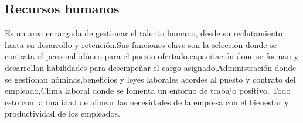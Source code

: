 
\subsection{Recursos humanos}
Es un area encargada de gestionar el talento humano, desde su reclutamiento hasta su desarrollo y retención.Sus funciones clave son la selección donde se contrata el personal idóneo para el puesto ofertado,capacitación done se forman y desarrollan habilidades para desempeñar el cargo asignado,Administración donde se gestionan nóminas,beneficios y leyes laborales acordes al puesto y contrato del empleado,Clima laboral donde se fomenta un entorno de trabajo positivo. Todo esto con la finalidad de alinear las necesidades de la empresa con el bienestar y productividad de los empleados.
